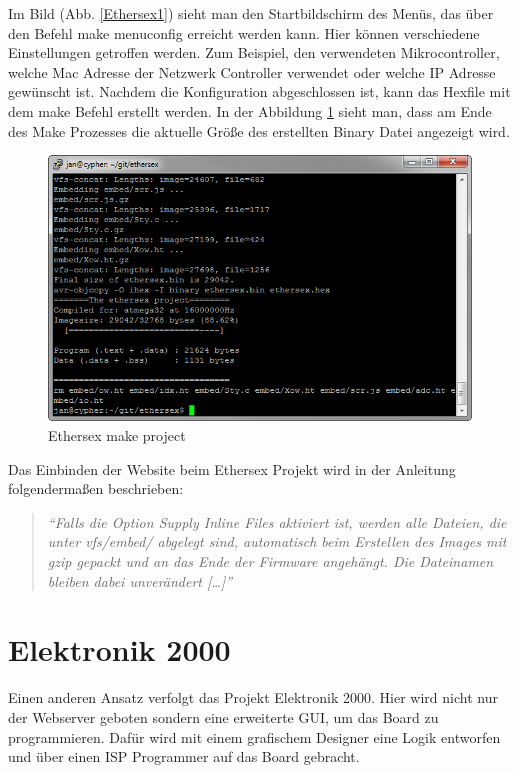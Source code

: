 Im Bild (Abb. \ref{Ethersex1}) sieht man den Startbildschirm des
Menüs, das über den Befehl \textrm{make menuconfig} erreicht werden kann.
Hier können verschiedene Einstellungen getroffen werden. Zum Beispiel, den
verwendeten Mikrocontroller, welche Mac Adresse der Netzwerk Controller
verwendet oder welche IP Adresse gewünscht ist.
Nachdem die Konfiguration abgeschlossen ist, kann das Hexfile mit dem
\textrm{make} Befehl erstellt werden. In der Abbildung \ref{Ethersex2} sieht man,
dass am Ende des \textrm{Make} Prozesses die aktuelle Größe des erstellten Binary Datei
angezeigt wird.

\begin{figure}[H]
	\centering
		\includegraphics[width=13cm]{content/pictures/Recherche/Ethersex/Ethersex2.png}
	\caption{Ethersex make project}
	\label{Ethersex2}
\end{figure} 

Das Einbinden der Website beim Ethersex Projekt wird in der Anleitung
folgendermaßen beschrieben:

\begin{quote}
	\textit{
		\enquote{Falls die Option Supply Inline Files aktiviert ist, werden alle
		Dateien, die unter vfs/embed/ abgelegt sind, automatisch beim Erstellen des
		Images mit gzip gepackt und an das Ende der Firmware angehängt. Die
		Dateinamen bleiben dabei unverändert [\ldots]} }
	\cite[\url{http://www.ethersex.de/index.php/HTTPD_(Deutsch)}]{Ethersex}
\end{quote}

\section{Elektronik 2000}

Einen anderen Ansatz verfolgt das Projekt Elektronik 2000.
Hier wird nicht nur der Webserver geboten sondern eine erweiterte GUI, um das
Board zu programmieren. Dafür wird mit einem grafischem Designer eine Logik
entworfen und über einen ISP Programmer auf das Board gebracht.

